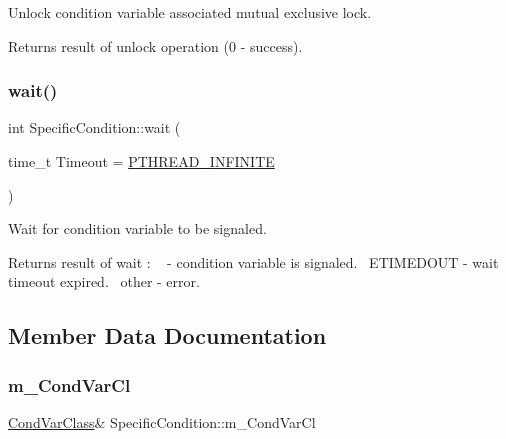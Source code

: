 Unlock condition variable associated mutual exclusive lock. \begin{DoxyReturn}{Returns}
result of unlock operation (0 -\/ success). 
\end{DoxyReturn}
\mbox{\label{classSpecificCondition_a56b9eb97c2713b979b54ce05534ff5c4}} 
\subsubsection{\texorpdfstring{wait()}{wait()}}
{\footnotesize\ttfamily int Specific\+Condition\+::wait (\begin{DoxyParamCaption}\item[{time\+\_\+t}]{Timeout = {\ttfamily \hyperlink{PThreadClassLib_8h_a9d2d74d73cb5d069fbfcbcfebf42bd6e}{P\+T\+H\+R\+E\+A\+D\+\_\+\+I\+N\+F\+I\+N\+I\+TE}} }\end{DoxyParamCaption})\hspace{0.3cm}{\ttfamily [inline]}}

Wait for condition variable to be signaled. \begin{DoxyReturn}{Returns}
result of wait \+: ~ -\/ condition variable is signaled.~\newline
 E\+T\+I\+M\+E\+D\+O\+UT -\/ wait timeout expired.~\newline
 other -\/ error.~\newline
 
\end{DoxyReturn}


\subsection{Member Data Documentation}
\mbox{\label{classSpecificCondition_af686c95919169acecede46f1821e1660}} 
\subsubsection{\texorpdfstring{m\+\_\+\+Cond\+Var\+Cl}{m\_CondVarCl}}
{\footnotesize\ttfamily \hyperlink{classCondVarClass}{Cond\+Var\+Class}\& Specific\+Condition\+::m\+\_\+\+Cond\+Var\+Cl\hspace{0.3cm}{\ttfamily [protected]}}



